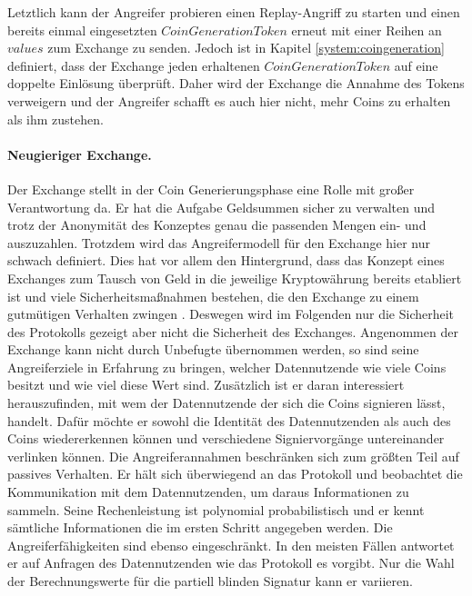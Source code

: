 \documentclass{scrreprt}
\begin{document}
Letztlich kann der Angreifer probieren einen Replay-Angriff zu starten und einen bereits einmal eingesetzten $CoinGenerationToken$ erneut mit einer Reihen an $values$ zum Exchange zu senden. Jedoch ist in Kapitel \ref{system:coingeneration} definiert, dass der Exchange jeden erhaltenen $CoinGenerationToken$ auf eine doppelte Einlösung überprüft. Daher wird der Exchange die Annahme des Tokens verweigern und der Angreifer schafft es auch hier nicht, mehr Coins zu erhalten als ihm zustehen.\\

\paragraph{Neugieriger Exchange.}
Der Exchange stellt in der Coin Generierungsphase eine Rolle mit großer Verantwortung da. Er hat die Aufgabe Geldsummen sicher zu verwalten und trotz der Anonymität des Konzeptes genau die passenden Mengen ein- und auszuzahlen. Trotzdem wird das Angreifermodell für den Exchange hier nur schwach definiert. Dies hat vor allem den Hintergrund, dass das Konzept eines Exchanges zum Tausch von Geld in die jeweilige Kryptowährung bereits etabliert ist und viele Sicherheitsmaßnahmen bestehen, die den Exchange zu einem gutmütigen Verhalten zwingen \cite{gnu-burdges2016enabling,kim2018risk,baum2021p2dex}. Deswegen wird im Folgenden nur die Sicherheit des Protokolls gezeigt aber nicht die Sicherheit des Exchanges.
Angenommen der Exchange kann nicht durch Unbefugte übernommen werden, so sind seine Angreiferziele in Erfahrung zu bringen, welcher Datennutzende wie viele Coins besitzt und wie viel diese Wert sind. Zusätzlich ist er daran interessiert herauszufinden, mit wem der Datennutzende der sich die Coins signieren lässt, handelt. Dafür möchte er sowohl die Identität des Datennutzenden als auch des Coins wiedererkennen können und verschiedene Signiervorgänge untereinander verlinken können. Die Angreiferannahmen beschränken sich zum größten Teil auf passives Verhalten. Er hält sich überwiegend an das Protokoll und beobachtet die Kommunikation mit dem Datennutzenden, um daraus Informationen zu sammeln. Seine Rechenleistung ist polynomial probabilistisch und er kennt sämtliche Informationen die im ersten Schritt angegeben werden. Die Angreiferfähigkeiten sind ebenso eingeschränkt. In den meisten Fällen antwortet er auf Anfragen des Datennutzenden wie das Protokoll es vorgibt. Nur die Wahl der Berechnungswerte für die partiell blinden Signatur kann er variieren.\\
\end{document}
